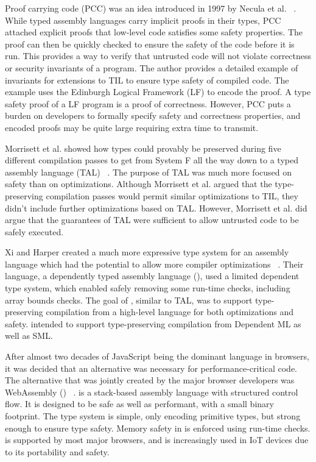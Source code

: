 Proof carrying code (PCC) was an idea introduced in 1997 by Necula et al. ~\cite{PCC}.
While typed assembly languages carry implicit proofs in their types, PCC attached explicit proofs that low-level code satisfies some safety properties.
The proof can then be quickly checked to ensure the safety of the code before it is run.
This provides a way to verify that untrusted code will not violate correctness or security invariants of a program.
The author provides a detailed example of invariants for extensions to TIL to ensure type safety of compiled code.
The example uses the Edinburgh Logical Framework (LF) to encode the proof.
A type safety proof of a LF program is a proof of correctness.
However, PCC puts a burden on developers to formally specify safety and correctness properties, and encoded proofs may be quite large requiring extra time to transmit.

Morrisett et al. showed how types could provably be preserved during five different compilation passes to get from System F all the way down to a typed assembly language (TAL) ~\cite{FtoTAL}.
The purpose of TAL was much more focused on safety than on optimizations.
Although Morrisett et al. argued that the type-preserving compilation passes would permit similar optimizations to TIL, they didn't include further optimizations based on TAL.
However, Morrisett et al. did argue that the guarantees of TAL were sufficient to allow untrusted code to be safely executed.

Xi and Harper created a much more expressive type system for an assembly language which had the potential to allow more compiler optimizations ~\cite{DTAL}.
Their language, a dependently typed assembly language (\dtal), used a limited dependent type system, which enabled safely removing some run-time checks, including array bounds checks.
The goal of \dtal, similar to TAL, was to support type-preserving compilation from a high-level language for both optimizations and safety.
\dtal intended to support type-preserving compilation from Dependent ML as well as SML.


After almost two decades of JavaScript being the dominant language in browsers, it was decided that an alternative was necessary for performance-critical code.
The alternative that was jointly created by the major browser developers was WebAssembly (\wasm) ~\cite{WASM}.
\wasm is a stack-based assembly language with structured control flow.
It is designed to be safe as well as performant, with a small binary footprint.
The \wasm type system is simple, only encoding primitive types, but strong enough to ensure type safety.
Memory safety in \wasm is enforced using run-time checks.
\wasm is supported by most major browsers, and is increasingly used in IoT devices due to its portability and safety.